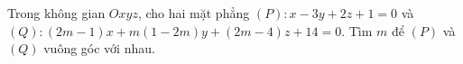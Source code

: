 \begin{ex}
Trong không gian $Oxyz$, cho hai mặt phẳng $(P)\colon x-3y+2z+1=0$ và $(Q)\colon (2m-1)x+m(1-2m)y+(2m-4)z+14=0$. Tìm $m$ để $(P)$ và $(Q)$ vuông góc với nhau.
\end{ex}
